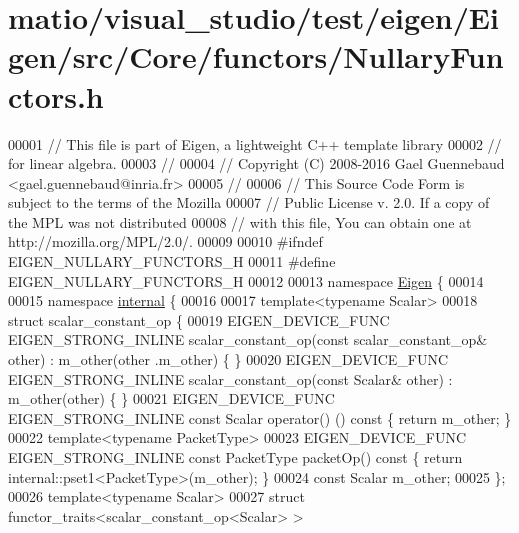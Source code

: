 \hypertarget{matio_2visual__studio_2test_2eigen_2_eigen_2src_2_core_2functors_2_nullary_functors_8h_source}{}\section{matio/visual\+\_\+studio/test/eigen/\+Eigen/src/\+Core/functors/\+Nullary\+Functors.h}
\label{matio_2visual__studio_2test_2eigen_2_eigen_2src_2_core_2functors_2_nullary_functors_8h_source}

\begin{DoxyCode}
00001 \textcolor{comment}{// This file is part of Eigen, a lightweight C++ template library}
00002 \textcolor{comment}{// for linear algebra.}
00003 \textcolor{comment}{//}
00004 \textcolor{comment}{// Copyright (C) 2008-2016 Gael Guennebaud <gael.guennebaud@inria.fr>}
00005 \textcolor{comment}{//}
00006 \textcolor{comment}{// This Source Code Form is subject to the terms of the Mozilla}
00007 \textcolor{comment}{// Public License v. 2.0. If a copy of the MPL was not distributed}
00008 \textcolor{comment}{// with this file, You can obtain one at http://mozilla.org/MPL/2.0/.}
00009 
00010 \textcolor{preprocessor}{#ifndef EIGEN\_NULLARY\_FUNCTORS\_H}
00011 \textcolor{preprocessor}{#define EIGEN\_NULLARY\_FUNCTORS\_H}
00012 
00013 \textcolor{keyword}{namespace }\hyperlink{namespace_eigen}{Eigen} \{
00014 
00015 \textcolor{keyword}{namespace }\hyperlink{namespaceinternal}{internal} \{
00016 
00017 \textcolor{keyword}{template}<\textcolor{keyword}{typename} Scalar>
00018 \textcolor{keyword}{struct }scalar\_constant\_op \{
00019   EIGEN\_DEVICE\_FUNC EIGEN\_STRONG\_INLINE scalar\_constant\_op(\textcolor{keyword}{const} scalar\_constant\_op& other) : m\_other(other
      .m\_other) \{ \}
00020   EIGEN\_DEVICE\_FUNC EIGEN\_STRONG\_INLINE scalar\_constant\_op(\textcolor{keyword}{const} Scalar& other) : m\_other(other) \{ \}
00021   EIGEN\_DEVICE\_FUNC EIGEN\_STRONG\_INLINE \textcolor{keyword}{const} Scalar operator() ()\textcolor{keyword}{ const }\{ \textcolor{keywordflow}{return} m\_other; \}
00022   \textcolor{keyword}{template}<\textcolor{keyword}{typename} PacketType>
00023   EIGEN\_DEVICE\_FUNC EIGEN\_STRONG\_INLINE \textcolor{keyword}{const} PacketType packetOp()\textcolor{keyword}{ const }\{ \textcolor{keywordflow}{return} 
      internal::pset1<PacketType>(m\_other); \}
00024   \textcolor{keyword}{const} Scalar m\_other;
00025 \};
00026 \textcolor{keyword}{template}<\textcolor{keyword}{typename} Scalar>
00027 \textcolor{keyword}{struct }functor\_traits<scalar\_constant\_op<Scalar> >

\end{DoxyCode}
